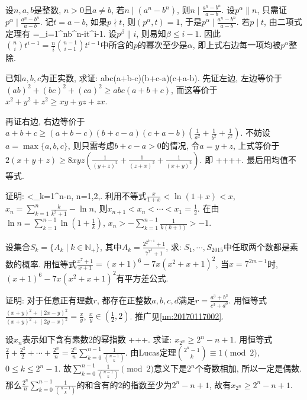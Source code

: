 \bq{}{}
设$n,a,b$是整数, $n>0$且$a\ne b$, 若$n\mid(a^n-b^n)$, 则$n\mid\frac{a^n-b^n}{a-b}$.
\eq
\ba
设$p^{\alpha}\| n$, 只需证$p^{\alpha}\mid\frac{a^n-b^n}{a-b}$. 记$t=a-b$, 如果$p\nmid t$,
则$(p^{\alpha}, t)=1$, 于是$p^{\alpha}\mid \frac{a^n-b^n}{a-b}$.
若$p\mid t$, 由二项式定理有
\bee
{}=\sum_{i=1}^{n}b^{n-i}t^{i-1}.
\eee
设$p^{\beta}\| i$, 则易知$\beta\le i-1$. 因此$\binom{n}{i}t^{i-1}=\frac{n}{i}\binom{n-1}{i-1}t^{i-1}$中所含的$p$的幂次至少是$\alpha$, 
即上式右边每一项均被$p^{\alpha}$整除.
\ea

已知$a, b, c$为正实数, 求证:
\bee
abc\ge {}\ge(a+b-c)(b+c-a)(c+a-b).
\eee
\eq
\ba
先证左边, 左边等价于$(ab)^2+(bc)^2+(ca)^2\ge abc(a+b+c)$, 而这等价于$x^2+y^2+z^2\ge xy+yz+zx$.

再证右边, 右边等价于$a+b+c\ge(a+b-c)(b+c-a)(c+a-b)\left(\frac1{a^2}+\frac1{b^2}+\frac1{c^2}\right)$. 不妨设$a=\max\{a,b,c\}$, 则只需考虑$b+c-a>0$的情况, 令$a=y+z$, 上式等价于$2(x+y+z)\ge8xyz\left(\frac1{(y+z)^2}+\frac1{(z+x)^2}+\frac1{(x+y)^2}\right)$. 即
\bee
{}++\ge{}++.
\eee
最后用均值不等式.
\ea

证明:
<\sum_{k=1}^{n}-\ln n\le{}, \quad n=1,2,\cdots.
\eee
\eq
\ba
利用不等式$\frac{x}{1+x}<\ln (1+x) < x$, $x_n=\sum_{k=1}^{n}\frac{k}{k^2+1}-\ln n$, 则$x_{n+1}<x_n<\cdots <x_1=\frac12$.
在由$\ln n=\sum_{k=1}^{n-1}\ln\left(1+\frac1k\right)$, $x_n>-\sum_{k=1}^{n-1}\frac{1}{k(k+1)}>-1$.
\ea

\bq{}{}
设集合$S_{k}=\{A_k\mid k\in\mathbb{N}_+\}$, 其中$A_{k}=\frac{2^{2^{k+1}}+1}{7^{7^k}+1}$, 求: $S_1, \cdots, S_{2015}$中任取两个数都是素数的概率.
\eq
\ba
用恒等式$\frac{x^7+1}{x+1}=(x+1)^6-7x(x^2+x+1)^2$, 当$x=7^{2m-1}$时, $(x+1)^6-7x(x^2+x+1)^2$有平方差公式.
\ea

证明: 对于任意正有理数$r$, 都存在正整数$a,b,c,d$满足$r=\frac{a^3+b^3}{c^3+d^3}$.
\eq
\ba
用恒等式$\frac{(x+y)^2+(2x-y)^2}{(x+y)^2+(2y-x)^2}=\frac{x}{y}$, $\frac{x}{y}\in\left(\frac12, 2\right)$. 推广见\ref{un:20170117002}.
\ea

设$x_n$表示如下含有素数$2$的幂指数
\bee
{}++\cdots+. 
\eee
求证: $x_{2^n}\ge 2^n-n+1$.
\eq
\ba
用恒等式$\frac{2}{1}+\frac{2^2}{2}+\cdots+\frac{2^n}{n}=\frac{2^n}{n}\sum_{k=0}^{n-1}\frac1{\binom{n-1}{k}}$. 
由Lucas定理$\binom{2^n-1}{k}\equiv 1\pmod{2}$, $0\le k\le 2^n-1$. 故$\sum_{k=0}^{n-1}\frac1{\binom{n-1}{k}}\pmod{2}$意义下是$2^n$个奇数相加, 
所以一定是偶数. 那么$\frac{2^n}{n}\sum_{k=0}^{n-1}\frac1{\binom{n-1}{k}}$的和含有的$2$的指数至少为$2^n-n+1$, 故有$x_{2^n}\ge2^n-n+1$.
\ea

